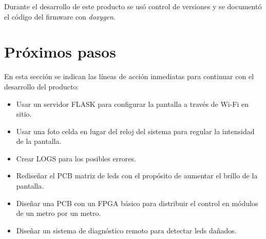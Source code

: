 Durante el desarrollo de este producto se usó control de versiones y se documentó el código del firmware con \textit{doxygen}.



\section{Próximos pasos}

En esta sección se indican las líneas de acción inmediatas para continuar con el desarrollo del producto:
\begin{itemize}
\item Usar un servidor FLASK para configurar la pantalla a través de Wi-Fi en sitio.
\item Usar una foto celda en lugar del reloj del sistema para regular la intensidad de la pantalla.
\item Crear LOGS para los posibles errores.
\item Rediseñar el PCB matriz de leds con el propósito de aumentar el brillo de la pantalla.
\item Diseñar una PCB con un FPGA básico para distribuir el control en módulos de un metro por un metro.
\item Diseñar un sistema de diagnóstico remoto para detectar leds dañados.
\end{itemize}
